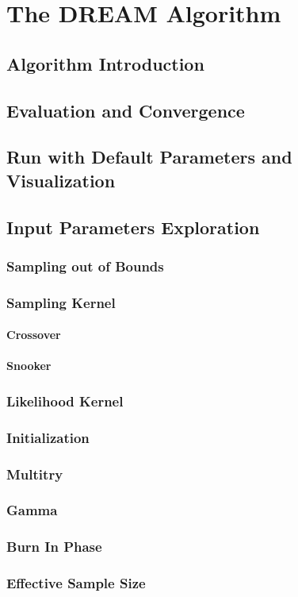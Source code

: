 \chapter{The DREAM Algorithm}

\section{Algorithm Introduction}

\section{Evaluation and Convergence}

\section{Run with Default Parameters and Visualization}

\section{Input Parameters Exploration}
\subsection{Sampling out of Bounds}

\subsection{Sampling Kernel}
\subsubsection{Crossover}

\subsubsection{Snooker}

\subsection{Likelihood Kernel}

\subsection{Initialization}

\subsection{Multitry}

\subsection{Gamma}

\subsection{Burn In Phase}

\subsection{Effective Sample Size}

